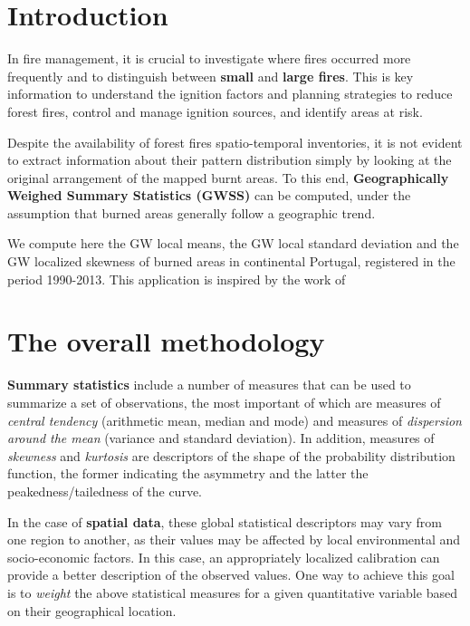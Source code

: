 \documentclass[
]{book}
\begin{document}
\hypertarget{introduction}{%
\section{Introduction}\label{introduction}}

In fire management, it is crucial to investigate where fires occurred more frequently and to distinguish between \textbf{small} and \textbf{large fires}.
This is key information to understand the ignition factors and planning strategies to reduce forest fires, control and manage ignition sources, and identify areas at risk.

Despite the availability of forest fires spatio-temporal inventories, it is not evident to extract information about their pattern distribution simply by looking at the original arrangement of the mapped burnt areas.
To this end, \textbf{Geographically Weighed Summary Statistics (GWSS)} can be computed, under the assumption that burned areas generally follow a geographic trend.

We compute here the GW local means, the GW local standard deviation and the GW localized skewness of burned areas in continental Portugal, registered in the period 1990-2013.
This application is inspired by the work of \citep{tonini_evolution_2017}

\hypertarget{the-overall-methodology}{%
\section{The overall methodology}\label{the-overall-methodology}}

\textbf{Summary statistics} include a number of measures that can be used to summarize a set of observations, the most important of which are measures of \emph{central tendency} (arithmetic mean, median and mode) and measures of \emph{dispersion around the mean} (variance and standard deviation).
In addition, measures of \emph{skewness} and \emph{kurtosis} are descriptors of the shape of the probability distribution function, the former indicating the asymmetry and the latter the peakedness/tailedness of the curve.

In the case of \textbf{spatial data}, these global statistical descriptors may vary from one region to another, as their values may be affected by local environmental and socio-economic factors.
In this case, an appropriately localized calibration can provide a better description of the observed values.
One way to achieve this goal is to \emph{weight} the above statistical measures for a given quantitative variable based on their geographical location.
\end{document}
